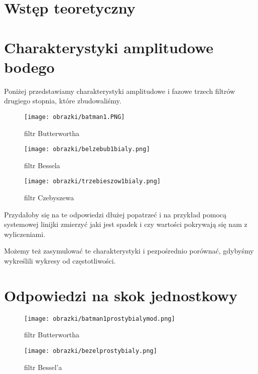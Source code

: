 \documentclass[a4paper,11pt]{article}
\begin{document}
\section{Wstęp teoretyczny}

\section{Charakterystyki amplitudowe bodego}

Poniżej przedstawiamy charakterystyki amplitudowe i fazowe trzech filtrów drugiego stopnia, które zbudowaliśmy.

\begin{figure}
\begin{center}
\texttt{[image: obrazki/batman1.PNG]}
\end{center}
\caption{filtr Butterwortha}
\end{figure}

\begin{figure}
\begin{center}
\texttt{[image: obrazki/belzebub1bialy.png]}
\end{center}
\caption{filtr Bessela}
\end{figure}

\begin{figure}
\begin{center}
\texttt{[image: obrazki/trzebieszow1bialy.png]}
\end{center}
\caption{filtr Czebyszewa}
\end{figure}


Przydałoby się na te odpowiedzi dłużej popatrzeć i na przykład
pomocą systemowej linijki zmierzyć jaki jest spadek i czy wartości
pokrywają się nam z wyliczeniami.

Możemy też zasymulować te charakterystyki i pezpośrednio porównać,
gdybyśmy wykreślili wykresy od częstotliwości.

\section{Odpowiedzi na skok jednostkowy}


\begin{figure}
\begin{center}
\texttt{[image: obrazki/batman1prostybialymod.png]}
\end{center}
\caption{filtr Butterwortha}
\end{figure}

\begin{figure}
\begin{center}
\texttt{[image: obrazki/bezelprostybialy.png]}
\end{center}
\caption{filtr Bessel'a}
\end{figure}
\end{document}

